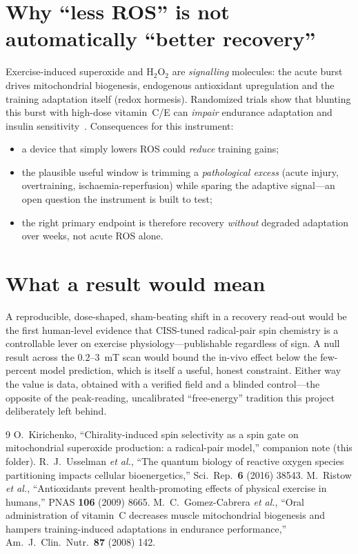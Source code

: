 \documentclass[11pt,a4paper]{article}
\begin{document}
\section{Why ``less ROS'' is not automatically ``better recovery''}
\label{sec:hormesis}
Exercise-induced superoxide and $\text{H}_2\text{O}_2$ are
\emph{signalling} molecules: the acute burst drives mitochondrial
biogenesis, endogenous antioxidant upregulation and the training
adaptation itself (redox hormesis). Randomized trials show that blunting
this burst with high-dose vitamin~C/E can \emph{impair} endurance
adaptation and insulin sensitivity~\cite{ristow,gomez}. Consequences for
this instrument:
\begin{itemize}\itemsep2pt
\item a device that simply lowers ROS could \emph{reduce} training gains;
\item the plausible useful window is trimming a \emph{pathological excess}
  (acute injury, overtraining, ischaemia-reperfusion) while sparing the
  adaptive signal---an open question the instrument is built to test;
\item the right primary endpoint is therefore recovery \emph{without}
  degraded adaptation over weeks, not acute ROS alone.
\end{itemize}

\section{What a result would mean}
A reproducible, dose-shaped, sham-beating shift in a recovery read-out
would be the first human-level evidence that CISS-tuned radical-pair spin
chemistry is a controllable lever on exercise physiology---publishable
regardless of sign. A null result across the $0.2$--$3$~mT scan would bound
the in-vivo effect below the few-percent model prediction, which is itself
a useful, honest constraint. Either way the value is data, obtained with a
verified field and a blinded control---the opposite of the peak-reading,
uncalibrated ``free-energy'' tradition this project deliberately left
behind.

\begin{thebibliography}{9}\small
{} O.~Kirichenko, ``Chirality-induced spin selectivity as
  a spin gate on mitochondrial superoxide production: a radical-pair
  model,'' companion note (this folder).
 R.~J.~Usselman \emph{et al.}, ``The quantum biology of
  reactive oxygen species partitioning impacts cellular bioenergetics,''
  Sci.\ Rep.\ \textbf{6} (2016) 38543.
 M.~Ristow \emph{et al.}, ``Antioxidants prevent
  health-promoting effects of physical exercise in humans,'' PNAS
  \textbf{106} (2009) 8665.
 M.~C.~Gomez-Cabrera \emph{et al.}, ``Oral administration of
  vitamin~C decreases muscle mitochondrial biogenesis and hampers
  training-induced adaptations in endurance performance,'' Am.\ J.\ Clin.\
  Nutr.\ \textbf{87} (2008) 142.
\end{thebibliography}
\end{document}
